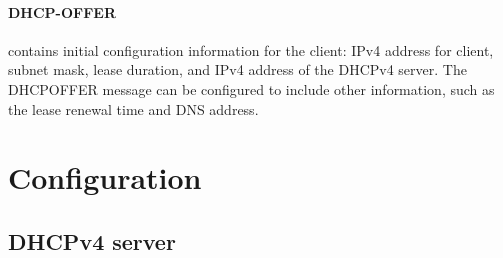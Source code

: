 \paragraph{DHCP-OFFER} contains initial configuration information for the client: IPv4 address for client, subnet mask, lease duration, and IPv4 address of the DHCPv4 server. The DHCPOFFER message can be configured to include other information, such as the lease renewal time and DNS address.


\section{Configuration}

\subsection{DHCPv4 server}

